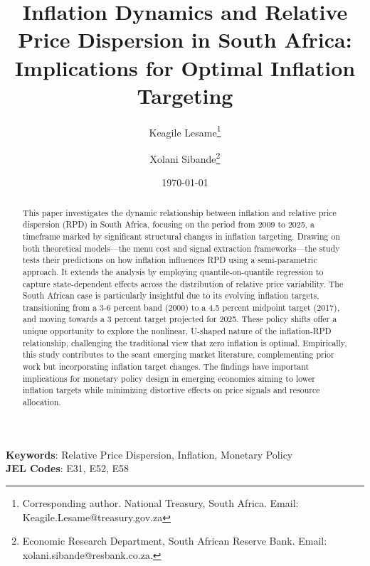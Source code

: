 \title{Inflation Dynamics and Relative Price Dispersion in South Africa: Implications for Optimal Inflation Targeting}
\author {Keagile Lesame\footnote{Corresponding author. National Treasury, South Africa. Email: Keagile.Lesame@treasury.gov.za} \and
Xolani Sibande\footnote{Economic Research Department, South African Reserve Bank. Email: xolani.sibande@resbank.co.za.}}


\date{\today}
\maketitle

\begin{abstract}
This paper investigates the dynamic relationship between inflation and relative price dispersion (RPD) in South Africa, focusing on the period from 2009 to 2025, a timeframe marked by significant structural changes in inflation targeting. Drawing on both theoretical models—the menu cost and signal extraction frameworks—the study tests their predictions on how inflation influences RPD using a semi-parametric approach. It extends the analysis by employing quantile-on-quantile regression to capture state-dependent effects across the distribution of relative price variability. The South African case is particularly insightful due to its evolving inflation targets, transitioning from a 3-6 percent band (2000) to a 4.5 percent midpoint target (2017), and moving towards a 3 percent target projected for 2025. These policy shifts offer a unique opportunity to explore the nonlinear, U-shaped nature of the inflation-RPD relationship, challenging the traditional view that zero inflation is optimal. Empirically, this study contributes to the scant emerging market literature, complementing prior work but incorporating inflation target changes. The findings have important implications for monetary policy design in emerging economies aiming to lower inflation targets while minimizing distortive effects on price signals and resource allocation.
\end{abstract}

\noindent\textbf{Keywords}: Relative Price Dispersion, Inflation, Monetary Policy\\
\textbf{JEL Codes}: E31, E52, E58
\newpage